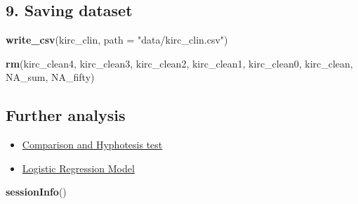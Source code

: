 \documentclass[]{article}
\newenvironment{Shaded}{\begin{snugshade}}{\end{snugshade}}
\newcommand{\KeywordTok}[1]{\textcolor[rgb]{0.13,0.29,0.53}{\textbf{#1}}}
\newcommand{\DataTypeTok}[1]{\textcolor[rgb]{0.13,0.29,0.53}{#1}}
\newcommand{\StringTok}[1]{\textcolor[rgb]{0.31,0.60,0.02}{#1}}
\newcommand{\NormalTok}[1]{#1}
\providecommand{\tightlist}{%
  \setlength{\itemsep}{0pt}\setlength{\parskip}{0pt}}
\begin{document}
\subsection{9. Saving dataset}\label{saving-dataset}

\begin{Shaded}
\begin{Highlighting}[]
\KeywordTok{write_csv}\NormalTok{(kirc_clin, }\DataTypeTok{path =} \StringTok{"data/kirc_clin.csv"}\NormalTok{)}

\KeywordTok{rm}\NormalTok{(kirc_clean4, kirc_clean3, kirc_clean2, kirc_clean1, kirc_clean0, kirc_clean, NA_sum, NA_fifty)}
\end{Highlighting}
\end{Shaded}

\subsection{Further analysis}\label{further-analysis}

\begin{itemize}
\tightlist
\item
  \href{2.correlation.md}{Comparison and Hyphotesis test}
\item
  \href{3.logistic_regression.md}{Logistic Regression Model}
\end{itemize}

\begin{Shaded}
\begin{Highlighting}[]
\KeywordTok{sessionInfo}\NormalTok{()}
\end{Highlighting}
\end{Shaded}
\end{document}
